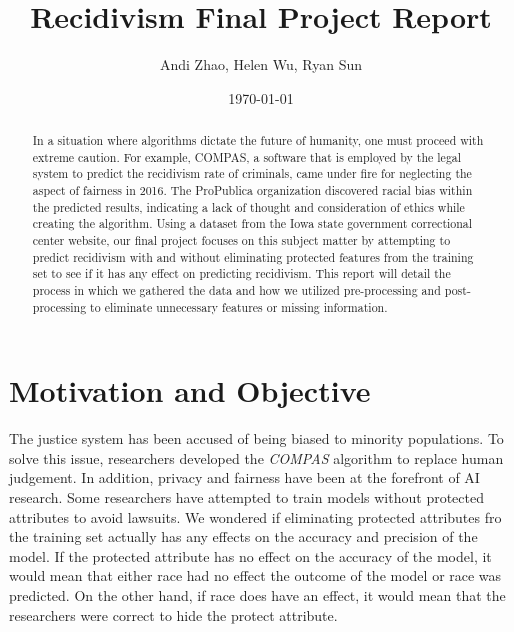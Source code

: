 \documentclass[10.5pt, sigconf]{acmart}
\begin{document}
\title{Recidivism Final Project Report}
\author{Andi Zhao, Helen Wu, Ryan Sun}
\date{\today}

\setlength\textwidth{\dimexpr (3in -1in/16)*2 + 3in/8\relax}
\setlength\columnsep{\dimexpr 3in/8\relax}

\begin{abstract}
In a situation where algorithms dictate the future of humanity, one must proceed with extreme caution. For example, COMPAS, a software that is employed by the legal system to predict the recidivism rate of criminals, came under fire for neglecting the aspect of fairness in 2016. The ProPublica organization discovered racial bias within the predicted results, indicating a lack of thought and consideration of ethics while creating the algorithm. Using a dataset from the Iowa state government correctional center website, our final project focuses on this subject matter by attempting to predict recidivism with and without eliminating protected features from the training set to see if it has any effect on predicting recidivism. This report will detail the process in which we gathered the data and how we utilized pre-processing and post-processing to eliminate unnecessary features or missing information. 
\end{abstract}

\renewcommand\footnotetextcopyrightpermission[1]{}
\pagestyle{plain}

\maketitle


\section{Motivation and Objective}
\hspace{5mm}The justice system has been accused of being biased to minority populations. To solve this issue, researchers developed the \emph{COMPAS} algorithm to replace human judgement. In addition, privacy and fairness have been at the forefront of AI research. Some researchers have attempted to train models without protected attributes to avoid lawsuits. We wondered if eliminating protected attributes fro the training set actually has any effects on the accuracy and precision of the model. If the protected attribute has no effect on the accuracy of the model, it would mean that  either race had no effect the outcome of the model or race was predicted. On the other hand, if race does have an effect, it would mean that the researchers were correct to hide the protect attribute.
\end{document}
